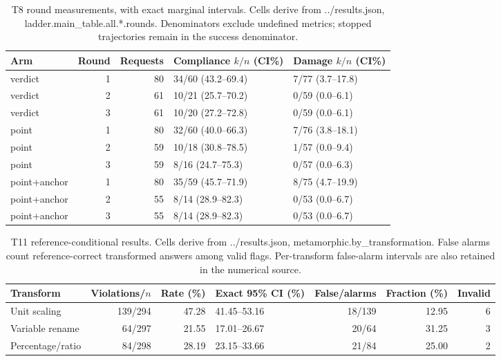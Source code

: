 \begin{table}[t]
\centering\small
\begin{tabular}{lrrll}
\hline
Arm & Round & Requests & Compliance $k/n$ (CI\%) & Damage $k/n$ (CI\%) \\
\hline
verdict & 1 & 80 & 34/60 (43.2--69.4) & 7/77 (3.7--17.8) \\
verdict & 2 & 61 & 10/21 (25.7--70.2) & 0/59 (0.0--6.1) \\
verdict & 3 & 61 & 10/20 (27.2--72.8) & 0/59 (0.0--6.1) \\
point & 1 & 80 & 32/60 (40.0--66.3) & 7/76 (3.8--18.1) \\
point & 2 & 59 & 10/18 (30.8--78.5) & 1/57 (0.0--9.4) \\
point & 3 & 59 & 8/16 (24.7--75.3) & 0/57 (0.0--6.3) \\
point+anchor & 1 & 80 & 35/59 (45.7--71.9) & 8/75 (4.7--19.9) \\
point+anchor & 2 & 55 & 8/14 (28.9--82.3) & 0/53 (0.0--6.7) \\
point+anchor & 3 & 55 & 8/14 (28.9--82.3) & 0/53 (0.0--6.7) \\
\hline
\end{tabular}
\caption{T8 round measurements, with exact marginal intervals. Cells derive from ../results.json, ladder.main\_table.all.*.rounds. Denominators exclude undefined metrics; stopped trajectories remain in the success denominator.}
\label{tab:rounds}
\end{table}
\begin{table}[t]
\centering\small
\begin{tabular}{lrrlrrr}
\hline
Transform & Violations/$n$ & Rate (\%) & Exact 95\% CI (\%) & False/alarms & Fraction (\%) & Invalid \\
\hline
Unit scaling & 139/294 & 47.28 & 41.45--53.16 & 18/139 & 12.95 & 6 \\
Variable rename & 64/297 & 21.55 & 17.01--26.67 & 20/64 & 31.25 & 3 \\
Percentage/ratio & 84/298 & 28.19 & 23.15--33.66 & 21/84 & 25.00 & 2 \\
\hline
\end{tabular}
\caption{T11 reference-conditional results. Cells derive from ../results.json, metamorphic.by\_transformation. False alarms count reference-correct transformed answers among valid flags. Per-transform false-alarm intervals are also retained in the numerical source.}
\label{tab:metamorphic}
\end{table}
